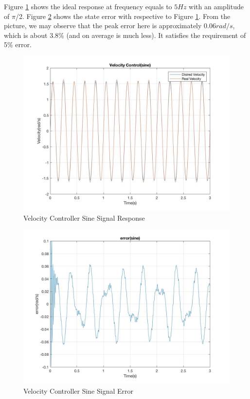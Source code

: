 \documentclass[letterpaper]{article}
\begin{document}
Figure \ref{velocity_control_sine} shows the ideal response at frequency equals to $5Hz$ with an amplitude of $\pi$/2. Figure \ref{velocity_control_sine_error} shows the state error with respective to Figure \ref{velocity_control_sine}. From the picture, we may observe that the peak error here is approximately $0.06 rad/s$, which is about 3.8\% (and on average is much less). It satisfies the requirement of 5\% error.\\
\begin{figure}[H]
\begin{center}
\includegraphics[width = 12cm]{Velocity_control(Sine).jpg}
\caption{Velocity Controller Sine Signal Response}
\label{velocity_control_sine}
\end{center}
\end{figure}

\begin{figure}[H]
\begin{center}
\includegraphics[width = 12cm]{Error(sine).jpg}
\caption{Velocity Controller Sine Signal Error}
\label{velocity_control_sine_error}
\end{center}
\end{figure}
\end{document}
